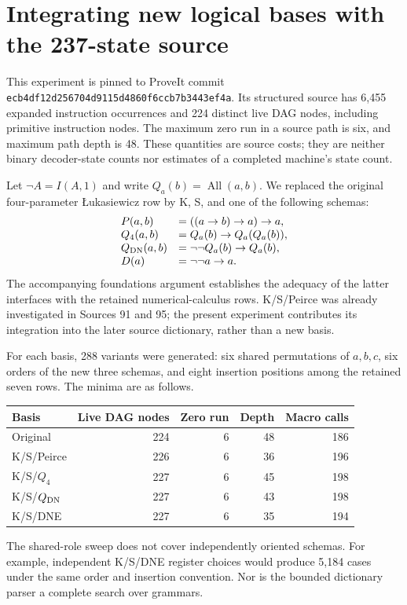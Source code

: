\section{Integrating new logical bases with the 237-state source}
\label{sec:source-basis-integration}

This experiment is pinned to ProveIt commit
\texttt{ecb4df12d256704d9115d4860f6ccb7b3443ef4a}.
Its structured source has 6,455 expanded instruction occurrences and 224
distinct live DAG nodes, including primitive instruction nodes.  The maximum
zero run in a source path is six, and maximum path depth is 48.  These quantities
are source costs; they are neither binary decoder-state counts nor estimates
of a completed machine's state count.

Let $\neg A=I(A,1)$ and write $Q_a(b)=\operatorname{All}(a,b)$.  We replaced the original four-parameter
\L{}ukasiewicz row by K, S, and one of the following schemas:
\[
\begin{array}{ll}
P(a,b)&=((a\to b)\to a)\to a,\\
Q_4(a,b)&=Q_a(b)\to Q_a(Q_a(b)),\\
Q_{\rm DN}(a,b)&=\neg\neg Q_a(b)\to Q_a(b),\\
D(a)&=\neg\neg a\to a.
\end{array}
\]
The accompanying foundations argument establishes the adequacy of the latter
interfaces with the retained numerical-calculus rows.  K/S/Peirce was already
investigated in Sources 91 and 95; the present experiment contributes its
integration into the later source dictionary, rather than a new basis.

For each basis, 288 variants were generated: six shared permutations of
$a,b,c$, six orders of the new three schemas, and eight insertion positions
among the retained seven rows.  The minima are as follows.
\begin{center}
\begin{tabular}{lrrrr}
\hline
Basis & Live DAG nodes & Zero run & Depth & Macro calls\\
\hline
Original &224&6&48&186\\
K/S/Peirce&226&6&36&196\\
K/S/$Q_4$&227&6&45&198\\
K/S/$Q_{\rm DN}$&227&6&43&198\\
K/S/DNE&227&6&35&194\\
\hline
\end{tabular}
\end{center}
The shared-role sweep does not cover independently oriented schemas.  For
example, independent K/S/DNE register choices would produce 5,184 cases under
the same order and insertion convention.  Nor is the bounded dictionary parser
a complete search over grammars.

